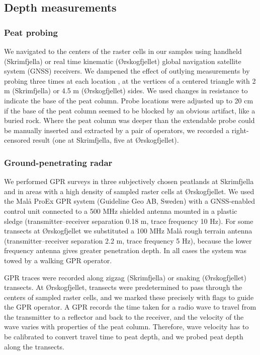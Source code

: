 \documentclass[soil, manuscript]{copernicus}
\begin{document}
\subsection{Depth measurements} \label{sec:depth-measurements}

\subsubsection{Peat probing}

We navigated to the centers of the raster cells in our samples using handheld (Skrimfjella) or real time kinematic (Ørskogfjellet) global navigation satellite system (GNSS) receivers.
We dampened the effect of outlying measurements by probing three times at each location \citep{parryEvaluatingApproachesEstimating2014}, at the vertices of a centered triangle with 2 m (Skrimfjella) or 4.5 m (Ørskogfjellet) sides.
We used changes in resistance to indicate the base of the peat column.
Probe locations were adjusted up to 20 cm if the base of the peat column seemed to be blocked by an obvious artifact, like a buried rock.
Where the peat column was deeper than the extendable probe could be manually inserted and extracted by a pair of operators, we recorded a right-censored result (one at Skrimfjella, five at Ørskogfjellet).

\subsubsection{Ground-penetrating radar}

We performed GPR surveys in three subjectively chosen peatlands at Skrimfjella and in areas with a high density of sampled raster cells at Ørskogfjellet.
We used the Malå ProEx GPR system (Guideline Geo AB, Sweden) with a GNSS-enabled control unit connected to a 500 MHz shielded antenna mounted in a plastic sledge (transmitter--receiver separation 0.18 m, trace frequency 10 Hz).
For some transects at Ørskogfjellet we substituted a 100 MHz Malå rough terrain antenna (transmitter--receiver separation 2.2 m, trace frequency 5 Hz), because the lower frequency antenna gives greater penetration depth.
In all cases the system was towed by a walking GPR operator.

GPR traces were recorded along zigzag (Skrimfjella) or snaking (Ørskogfjellet) transects.
At Ørskogfjellet, transects were predetermined to pass through the centers of sampled raster cells, and we marked these precisely with flags to guide the GPR operator.
A GPR records the time taken for a radio wave to travel from the transmitter to a reflector and back to the receiver, and the velocity of the wave varies with properties of the peat column.
Therefore, wave velocity has to be calibrated to convert travel time to peat depth, and we probed peat depth along the transects.
\end{document}
